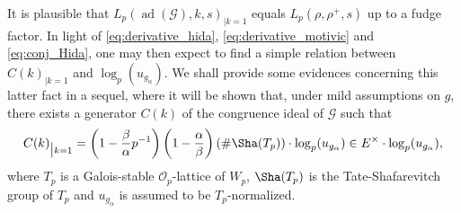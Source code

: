 \documentclass[12pt]{amsart}
\newcommand\cG{\mathcal{G}}
\newcommand\cL{\mathcal{L}}
\newcommand\cO{\mathcal{O}}
\DeclareMathOperator{\ad}{ad}
\theoremstyle{defstyle}
\theoremstyle{thmstyle}
\begin{document}
It is plausible that $L_p(\ad(\cG),k,s)_{|k=1}$ equals $L_p(\rho,\rho^+,s)$ up to a fudge factor. In light of \eqref{eq:derivative_hida}, \eqref{eq:derivative_motivic} and \eqref{eq:conj_Hida}, one may then expect to find a simple relation between $C(k)_{|k=1}$ and $\log_p (u_{g_\alpha})$. We shall provide some evidences concerning this latter fact in a sequel, where it will be shown that, under mild assumptions on $g$, there exists a generator $C(k)$ of the congruence ideal of $\cG$ such that
\[C(k)_{\big|k=1}=\left(1-\frac{\beta}{\alpha}p^{-1}\right)\left(1-\frac{\alpha}{\beta}\right)(\#\Sha(T_p))\cdot \log_p (u_{g_\alpha})\in E^\times\cdot \log_p (u_{g_\alpha}),\]
where $T_p$ is a Galois-stable $\cO_p$-lattice of $W_p$, $\Sha(T_p)$ is the Tate-Shafarevitch group of $T_p$ and $u_{g_\alpha}$ is assumed to be $T_p$-normalized.

 
\end{document}
